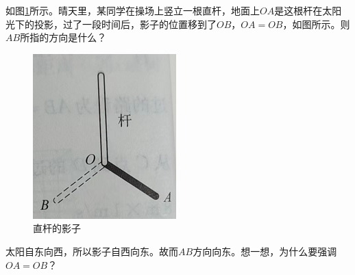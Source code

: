 \documentclass[windows,csize4, answers]{BHCexam}
\begin{document}
\begin{groups}
\begin{questions}[]
        \question[5] 如图\ref{fig:fig_3_7}所示。晴天里，某同学在操场上竖立一根直杆，地面上$OA$是这根杆在太阳光下的投影，过了一段时间后，影子的位置移到了$OB$，$OA=OB$，如图所示。则$AB$所指的方向是什么？
        \begin{figure}[htb]
            \centering
            \includegraphics [scale=0.75,trim=0 0 0 0]{./image/fig_3_7.PNG}
            \caption{直杆的影子}
            \label{fig:fig_3_7}
        \end{figure}
        \begin{solution}{0.5cm}
            \methodonly 太阳自东向西，所以影子自西向东。故而$AB$方向向东。想一想，为什么要强调$OA=OB$？
        \end{solution}



    \end{questions}
















\end{groups}




\label{lastpage}
\end{document}
